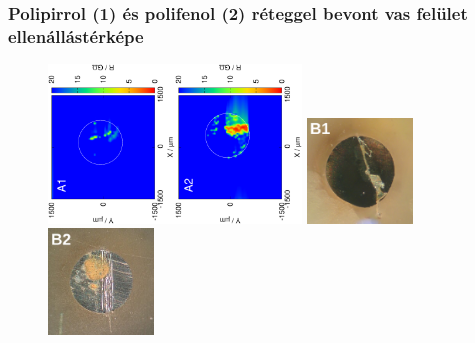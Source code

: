 \documentclass{beamer}
\begin{document}
\begin{frame}
\frametitle{Polipirrol (1) és polifenol (2) réteggel bevont vas felület ellenállástérképe}
\begin{figure}
\centering
\includegraphics[trim = 15mm 30mm 0mm 15mm, clip, width=0.3\textwidth, angle=-90]{18012501_deconvoluted_r.eps}\hspace{0.6cm}\includegraphics[trim = 15mm 30mm 0mm 15mm, clip, width=0.3\textwidth, angle=-90]{18012406_deconvoluted_r.eps}
\includegraphics[width=0.25\textwidth]{ppyrrole_cut.jpg}\hspace{2cm}\includegraphics[width=0.25\textwidth]{pphenol_cut.jpg}
\end{figure}
\end{frame}
\end{document}
